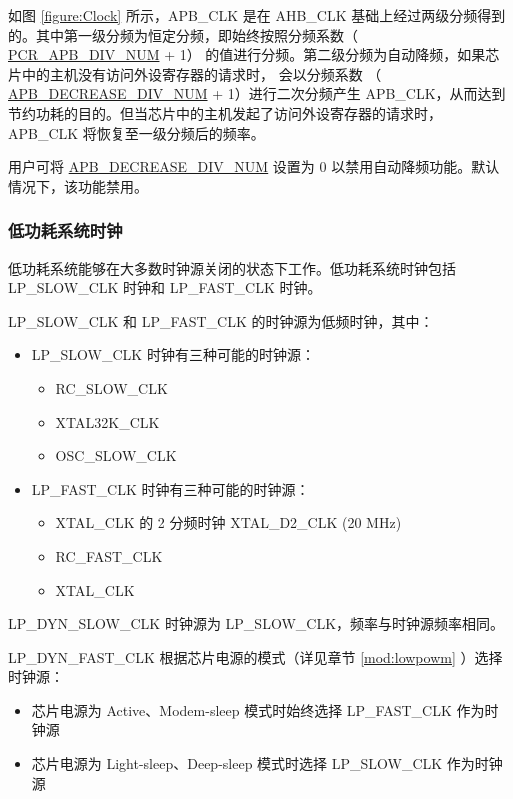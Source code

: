 \documentclass[main\_\_CN.tex]{subfiles}
\begin{document}
如图 \ref{figure:Clock} 所示，APB\_CLK 是在 AHB\_CLK 基础上经过两级分频得到的。其中第一级分频为恒定分频，即始终按照分频系数（ \hyperref[fielddesc:PCRAPBDIVNUM]{PCR\_APB\_DIV\_NUM} + 1） 的值进行分频。第二级分频为自动降频，如果芯片中的主机没有访问外设寄存器的请求时， 会以分频系数 （ \hyperref[fielddesc:PCRAPBDECREASEDIVNUM]{APB\_DECREASE\_DIV\_NUM} + 1）进行二次分频产生 APB\_CLK，从而达到节约功耗的目的。但当芯片中的主机发起了访问外设寄存器的请求时，APB\_CLK 将恢复至一级分频后的频率。

用户可将 \hyperref[fielddesc:PCRAPBDECREASEDIVNUM]{APB\_DECREASE\_DIV\_NUM} 设置为 0 以禁用自动降频功能。默认情况下，该功能禁用。



\subsubsection{低功耗系统时钟}

低功耗系统能够在大多数时钟源关闭的状态下工作。低功耗系统时钟包括 LP\_SLOW\_CLK 时钟和 LP\_FAST\_CLK 时钟。

LP\_SLOW\_CLK 和 LP\_FAST\_CLK 的时钟源为低频时钟，其中：
\begin{itemize}
    \item LP\_SLOW\_CLK 时钟有三种可能的时钟源：
    \begin{itemize}
        \item RC\_SLOW\_CLK
        \item XTAL32K\_CLK
        \item OSC\_SLOW\_CLK
    \end{itemize}
    \item LP\_FAST\_CLK 时钟有三种可能的时钟源：
    \begin{itemize}
        \item XTAL\_CLK 的 2 分频时钟 XTAL\_D2\_CLK (20 MHz)
        \item RC\_FAST\_CLK
        \item XTAL\_CLK
    \end{itemize}
\end{itemize}

LP\_DYN\_SLOW\_CLK 时钟源为 LP\_SLOW\_CLK，频率与时钟源频率相同。

LP\_DYN\_FAST\_CLK 根据芯片电源的模式（详见章节 \ref{mod:lowpowm} \textit{}）选择时钟源：

\begin{itemize}
    \item 芯片电源为 Active、Modem-sleep 模式时始终选择 LP\_FAST\_CLK 作为时钟源
    \item 芯片电源为 Light-sleep、Deep-sleep 模式时选择 LP\_SLOW\_CLK 作为时钟源
\end{itemize}
\end{document}
